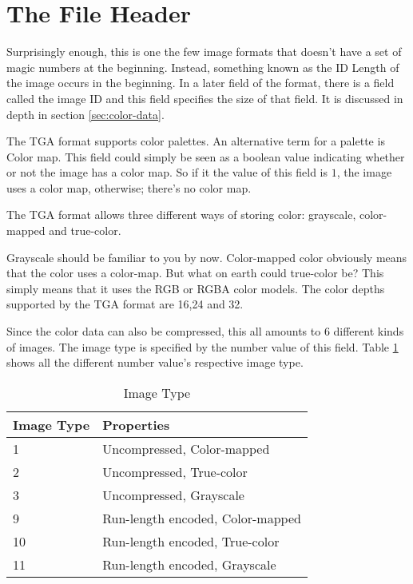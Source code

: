   \section{The File Header}


  Surprisingly enough, this is one the few image formats that doesn't
  have a set of magic numbers at the beginning. Instead, something
  known as the ID Length of the image occurs in the beginning. In a
  later field of the format, there is a field called the image
  ID and this field specifies the size of that field. It is discussed
  in depth in section \ref{sec:color-data}.


  The TGA format supports color palettes. An alternative term for a
  palette is Color map. This field could simply be
  seen as a boolean value indicating whether or not the image has a
  color map. So if it the value of this field is $1$, the image uses a
  color map, otherwise; there's no color map.


  The TGA format allows three different ways of storing color:
  grayscale, color-mapped and
  true-color.

  Grayscale should be familiar to you by now. Color-mapped color
  obviously means that the color uses a color-map. But what on earth
  could true-color be? This simply means that it uses the RGB or RGBA
  color models. The color depths supported by the TGA format are
  16,24 and 32.

  Since the color data can also be compressed, this all amounts to $6$
  different kinds of images. The image type is specified by the number
  value of this field. Table \ref{tab:imgtype} shows all the different
  number value's respective image type.

  \begin{table}
    \centering
    \begin{tabular}{ll}
      \toprule
      Image Type & Properties \\
      \midrule
      1 & Uncompressed, Color-mapped \\
      2 & Uncompressed, True-color \\
      3 & Uncompressed, Grayscale\\
      9 & Run-length encoded, Color-mapped \\
      10 & Run-length encoded, True-color \\
      11 & Run-length encoded, Grayscale\\
      \bottomrule
    \end{tabular}
    \caption{Image Type}
    \label{tab:imgtype}
  \end{table}

